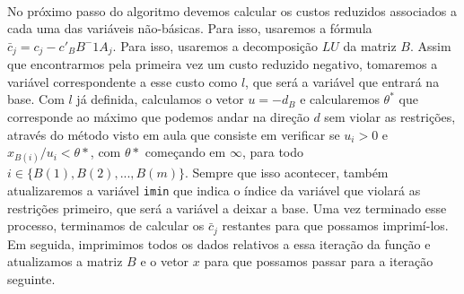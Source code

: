 \documentclass[a4paper]{article}
\begin{document}
\paragraph{}
No próximo passo do algoritmo devemos calcular os custos reduzidos associados a cada uma das variáveis não-básicas. Para isso, usaremos a fórmula \begin{math}\bar{c}_{j} = c_{j} - c'_{B}B^-1A_{j}\end{math}. Para isso, usaremos a decomposição $LU$ da matriz $B$.
Assim que encontrarmos pela primeira vez um custo reduzido negativo, tomaremos a variável correspondente a esse custo como $l$, que será a variável que entrará na base. Com $l$ já definida, calculamos o vetor $u = -d_{B}$ e calcularemos $\theta^*$ que corresponde ao máximo que podemos andar na direção $d$ sem violar as restrições, através do método visto em aula que consiste em verificar se $u_{i} > 0$ e $x_{B(i)}/u_{i} < \theta*$, com $\theta*$ começando em $\infty$, para todo $i \in \{B(1), B(2), ..., B(m)\}$. Sempre que isso acontecer, também atualizaremos a variável \texttt{imin} que indica o índice da variável que violará as restrições primeiro, que será a variável a deixar a base.
Uma vez terminado esse processo, terminamos de calcular os $\bar{c}_{j}$ restantes para que possamos imprimí-los.
Em seguida, imprimimos todos os dados relativos a essa iteração da função e atualizamos a matriz $B$ e o vetor $x$ para que possamos passar para a iteração seguinte.
\end{document}
